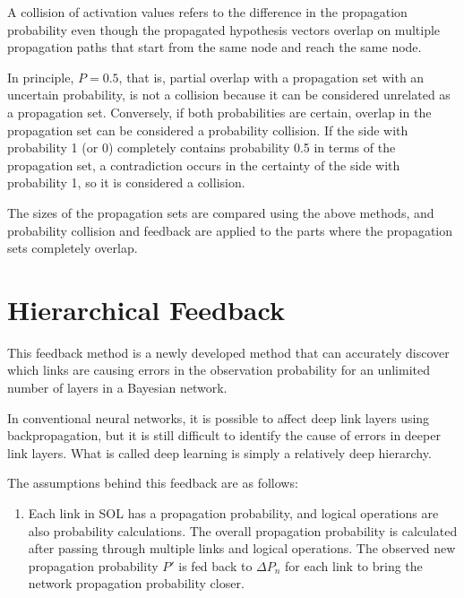 \documentclass[12pt]{article}
\begin{document}
A collision of activation values \hspace{0pt}\hspace{0pt}refers to the
difference in the propagation probability even though the propagated
hypothesis vectors overlap on multiple propagation paths that start from
the same node and reach the same node.

In principle, \(P=0.5\), that is, partial overlap with a propagation set
with an uncertain probability, is not a collision because it can be
considered unrelated as a propagation set. Conversely, if both
probabilities are certain, overlap in the propagation set can be
considered a probability collision. If the side with probability 1 (or
0) completely contains probability 0.5 in terms of the propagation set,
a contradiction occurs in the certainty of the side with probability 1,
so it is considered a collision.

The sizes of the propagation sets are compared using the above methods,
and probability collision and feedback are applied to the parts where
the propagation sets completely overlap.

\section{Hierarchical Feedback}
\label{hierarchical-feedback}

This feedback method is a newly developed method that can accurately
discover which links are causing errors in the observation probability
for an unlimited number of layers in a Bayesian network.

In conventional neural networks, it is possible to affect deep link
layers using backpropagation, but it is still difficult to identify the
cause of errors in deeper link layers. What is called deep learning is
simply a relatively deep hierarchy.

The assumptions behind this feedback are as follows:

\begin{enumerate}
\def\labelenumi{\arabic{enumi}.}

\item
  Each link in SOL has a propagation probability, and logical operations
  are also probability calculations. The overall propagation probability
  is calculated after passing through multiple links and logical
  operations. The observed new propagation probability \(P'\) is fed
  back to \(\Delta P_n\) for each link to bring the network propagation
  probability closer.
\end{enumerate}
\end{document}
